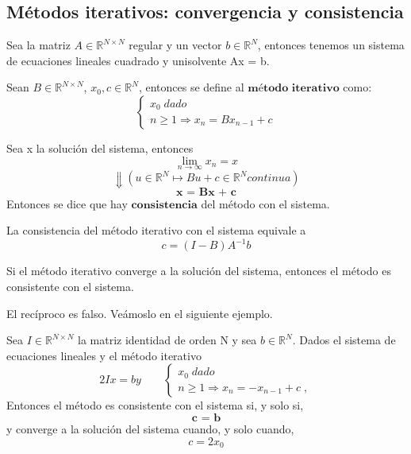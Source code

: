 \subsection{Métodos iterativos: convergencia y consistencia}
Sea la matriz $A \in \mathbb{R}^{N \times N}$ regular y un vector $b \in \mathbb{R}^N$, entonces tenemos un sistema de ecuaciones lineales cuadrado y unisolvente Ax = b.

\begin{ndef}
Sean $B \in \mathbb{R}^{N \times N}$, $x_0,c \in \mathbb{R}^N$, entonces se define al $\textbf{método iterativo}$ como:
\[ \left\{ \begin{array}{c}
x_0 \; dado \\
n \geq 1 \Rightarrow x_n = Bx_{n-1}+c
\end{array}
\right. \]
\end{ndef}

\begin{ndef}[Consistencia]
Sea x la solución del sistema, entonces
\[ \lim_{n \rightarrow \infty}x_n = x \]
\[ \Downarrow (u \in \mathbb{R}^N \mapsto Bu + c \in \mathbb{R}^N continua) \]
\[ \textbf{x = Bx + c} \]
Entonces se dice que hay $\textbf{consistencia}$ del método con el sistema.
\end{ndef}

\begin{nprop}
La consistencia del método iterativo con el sistema equivale a
\[ c = (I-B)A^{-1}b \]
\end{nprop}

\begin{nprop}
Si el método iterativo converge a la solución del sistema, entonces el método es consistente con el sistema.
\end{nprop}

El recíproco es falso. Veámoslo en el siguiente ejemplo.

\begin{ejemplo} Sea $I \in \mathbb{R}^{N \times N}$ la matriz identidad de orden N y sea $b \in \mathbb{R}^N$. Dados el sistema de ecuaciones lineales y el método iterativo
\[
2Ix = b y \qquad \left\{ \begin{array}{c}
x_0 \; dado \\
n \geq 1 \Rightarrow x_n = -x_{n-1}+c \; ,
\end{array}
\right.
\]
Entonces el método es consistente con el sistema si, y solo si,
\[ \textbf{c = b} \]
y converge a la solución del sistema cuando, y solo cuando,
\[ c = 2x_0 \]
\end{ejemplo}

